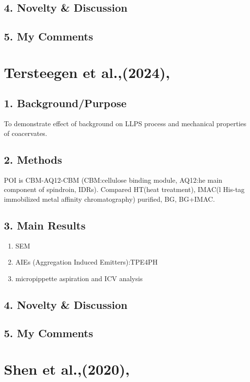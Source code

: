 \documentclass{ltjsarticle}
\numberwithin{equation}{subsection}
\begin{document}
\subsection{4. Novelty \& Discussion}

\subsection{5. My Comments}
\newpage
\section{Tersteegen et al.,(2024),\cite{tersteegen}}

\subsection{1. Background/Purpose}
To demonstrate effect of background on LLPS process and mechanical properties of coacervates.
\subsection{2. Methods}
POI is CBM-AQ12-CBM (CBM:cellulose binding module, AQ12:he main component of spindroin, IDRs).
Compared HT(heat treatment), IMAC(l His-tag immobilized metal affinity chromatography) purified, BG, BG+IMAC.

\subsection{3. Main Results}
\begin{enumerate}
    \item SEM
    \item AIEs
    (Aggregation Induced Emitters):TPE4PH
    \item micropippette aspiration and ICV analysis   
\end{enumerate}
\subsection{4. Novelty \& Discussion}

\subsection{5. My Comments}
\newpage
\section{Shen et al.,(2020),\cite{shen}}
\end{document}
